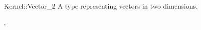 \begin{ccRefConcept}{Kernel::Vector_2}
\ccDefinition
A type representing vectors in two dimensions.

\ccRefines
{},

\ccSeeAlso
{}

\end{ccRefConcept}
